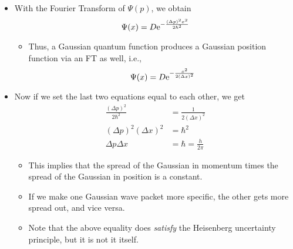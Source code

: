\documentclass[../notes.tex]{subfiles}
\begin{document}
\begin{itemize}
\begin{itemize}
    \end{itemize}
    \item With the Fourier Transform of $\Psi(p)$, we obtain
    \begin{equation*}
        \Psi(x) = D\e[-\frac{(\Delta p)^2x^2}{2\hbar^2}]
    \end{equation*}
    \begin{itemize}
        \item Thus, a Gaussian quantum function produces a Gaussian position function via an FT as well, i.e.,
        \begin{equation*}
            \Psi(x) = D\e[-\frac{x^2}{2(\Delta x)^2}]
        \end{equation*}
    \end{itemize}
    \item Now if we set the last two equations equal to each other, we get
    \begin{align*}
        \frac{(\Delta p)^2}{2\hbar^2} &= \frac{1}{2(\Delta x)^2}\\
        (\Delta p)^2(\Delta x)^2 &= \hbar^2\\
        \Delta p\Delta x &= \hbar = \frac{h}{2\pi}
    \end{align*}
    \begin{itemize}
        \item This implies that the spread of the Gaussian in momentum times the spread of the Gaussian in position is a constant.
        \item If we make one Gaussian wave packet more specific, the other gets more spread out, and vice versa.
        \item Note that the above equality does \emph{satisfy} the Heisenberg uncertainty principle, but it is not it itself.
    \end{itemize}
\end{itemize}
\end{document}

